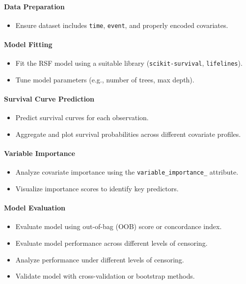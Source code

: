 \paragraph*{Data Preparation}
\begin{itemize}
    \item Ensure dataset includes \texttt{time}, \texttt{event}, and properly encoded covariates.
\end{itemize}

\paragraph*{Model Fitting}
\begin{itemize}
    \item Fit the RSF model using a suitable library (\texttt{scikit-survival}, \texttt{lifelines}).
    \item Tune model parameters (e.g., number of trees, max depth).
\end{itemize}

\paragraph*{Survival Curve Prediction}
\begin{itemize}
    \item Predict survival curves for each observation.
    \item Aggregate and plot survival probabilities across different covariate profiles.
\end{itemize}

\paragraph*{Variable Importance}
\begin{itemize}
    \item Analyze covariate importance using the \texttt{variable\_importance\_} attribute.
    \item Visualize importance scores to identify key predictors.
\end{itemize}

\paragraph*{Model Evaluation}
\begin{itemize}
    \item Evaluate model using out-of-bag (OOB) score or concordance index.
    \item Evaluate model performance across different levels of censoring.
    \item Analyze performance under different levels of censoring.
    \item Validate model with cross-validation or bootstrap methods.
\end{itemize}

